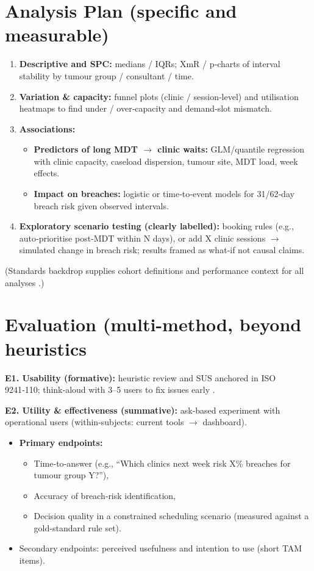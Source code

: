 \documentclass[12pt, a4paper, twoside]{article} %
\begin{document}
\section{Analysis Plan (specific and measurable)}

\begin{enumerate}
  \item \textbf{Descriptive and SPC:} medians / IQRs; XmR / p‑charts of interval stability by tumour group / consultant / time.
  \item \textbf{Variation \& capacity:} funnel plots (clinic / session‑level) and utilisation heatmaps to find under / over‑capacity and demand‑slot mismatch.
  \item \textbf{Associations:}
  \begin{itemize}
    \item \textbf{Predictors of long MDT $\rightarrow$ clinic waits:} GLM/quantile regression with clinic capacity, caseload dispersion, tumour site, MDT load, week effects.
    \item \textbf{Impact on breaches:} logistic or time‑to‑event models for 31/62‑day breach risk given observed intervals.
  \end{itemize}
  \item \textbf{Exploratory scenario testing (clearly labelled):} booking rules (e.g., auto‑prioritise post‑MDT within N days), or add X clinic sessions $\rightarrow$ simulated change in breach risk; results framed as what‑if not causal claims.
\end{enumerate}

(Standards backdrop supplies cohort definitions and performance context for all analyses \citep{johnson2024}.)

\section{Evaluation (multi-method, beyond heuristics}

\textbf{E1. Usability (formative):} heuristic review and SUS anchored in ISO 9241‑110; think‑aloud with 3–5 users to fix issues early \citep{ISO9241-2020}.

\textbf{E2. Utility \& effectiveness (summative):} ask‑based experiment with operational users (within‑subjects: current tools $\rightarrow$ dashboard).

\begin{itemize}
\item \textbf{Primary endpoints:}
\begin{itemize}
    \item Time‑to‑answer (e.g., “Which clinics next week risk X\% breaches for tumour group Y?”),
    \item Accuracy of breach‑risk identification,
    \item Decision quality in a constrained scheduling scenario (measured against a gold‑standard rule set).
\end{itemize}
\item Secondary endpoints: perceived usefulness and intention to use (short TAM items).
\end{itemize}
\end{document}
